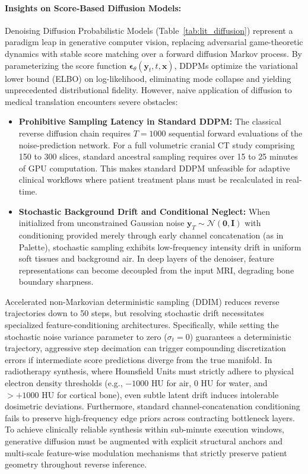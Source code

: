 \paragraph{Insights on Score-Based Diffusion Models:}
Denoising Diffusion Probabilistic Models (Table~\ref{tab:lit_diffusion}) represent a paradigm leap in generative computer vision, replacing adversarial game-theoretic dynamics with stable score matching over a forward diffusion Markov process. By parameterizing the score function $\boldsymbol{\epsilon}_\theta(\mathbf{y}_t, t, \mathbf{x})$, DDPMs optimize the variational lower bound (ELBO) on log-likelihood, eliminating mode collapse and yielding unprecedented distributional fidelity. However, naive application of diffusion to medical translation encounters severe obstacles:
\begin{itemize}
    \item \textbf{Prohibitive Sampling Latency in Standard DDPM:} The classical reverse diffusion chain requires $T = 1000$ sequential forward evaluations of the noise-prediction network. For a full volumetric cranial CT study comprising 150 to 300 slices, standard ancestral sampling requires over 15 to 25 minutes of GPU computation. This makes standard DDPM unfeasible for adaptive clinical workflows where patient treatment plans must be recalculated in real-time.
    \item \textbf{Stochastic Background Drift and Conditional Neglect:} When initialized from unconstrained Gaussian noise $\mathbf{y}_T \sim \mathcal{N}(\mathbf{0}, \mathbf{I})$ with conditioning provided merely through early channel concatenation (as in Palette), stochastic sampling exhibits low-frequency intensity drift in uniform soft tissues and background air. In deep layers of the denoiser, feature representations can become decoupled from the input MRI, degrading bone boundary sharpness.
\end{itemize}

Accelerated non-Markovian deterministic sampling (DDIM) reduces reverse trajectories down to 50 steps, but resolving stochastic drift necessitates specialized feature-conditioning architectures. Specifically, while setting the stochastic noise variance parameter to zero ($\sigma_t = 0$) guarantees a deterministic trajectory, aggressive step decimation can trigger compounding discretization errors if intermediate score predictions diverge from the true manifold. In radiotherapy synthesis, where Hounsfield Units must strictly adhere to physical electron density thresholds (e.g., $-1000\text{ HU}$ for air, $0\text{ HU}$ for water, and $>+1000\text{ HU}$ for cortical bone), even subtle latent drift induces intolerable dosimetric deviations. Furthermore, standard channel-concatenation conditioning fails to preserve high-frequency edge priors across contracting bottleneck layers. To achieve clinically reliable synthesis within sub-minute execution windows, generative diffusion must be augmented with explicit structural anchors and multi-scale feature-wise modulation mechanisms that strictly preserve patient geometry throughout reverse inference.


